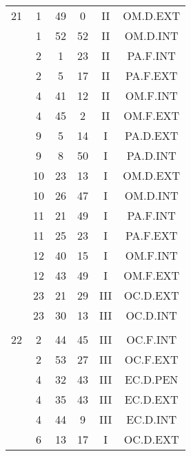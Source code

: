 \documentclass[12pt, a4paper]{article}
\begin{document}
\begin{multicols}{3}
{\begin{tabular}{c c c c c c}
	 	 	 	21 & 1 & 49 & 0 & II & OM.D.EXT\\%
	 	 	 	 & 1 & 52 & 52 & II & OM.D.INT\\%
	 	 	 	 & 2 & 1 & 23 & II & PA.F.INT\\%
	 	 	 	 & 2 & 5 & 17 & II & PA.F.EXT\\%
	 	 	 	 & 4 & 41 & 12 & II & OM.F.INT\\%
	 	 	 	 & 4 & 45 & 2 & II & OM.F.EXT\\%
	 	 	 	 & 9 & 5 & 14 & I & PA.D.EXT\\%
	 	 	 	 & 9 & 8 & 50 & I & PA.D.INT\\%
	 	 	 	 & 10 & 23 & 13 & I & OM.D.EXT\\%
	 	 	 	 & 10 & 26 & 47 & I & OM.D.INT\\%
	 	 	 	 & 11 & 21 & 49 & I & PA.F.INT\\%
	 	 	 	 & 11 & 25 & 23 & I & PA.F.EXT\\%
	 	 	 	 & 12 & 40 & 15 & I & OM.F.INT\\%
	 	 	 	 & 12 & 43 & 49 & I & OM.F.EXT\\%
	 	 	 	 & 23 & 21 & 29 & III & OC.D.EXT\\%
	 	 	 	 & 23 & 30 & 13 & III & OC.D.INT\\%
	 	 	 	 & & & & & \\%
	 	 	 	22 & 2 & 44 & 45 & III & OC.F.INT\\%
	 	 	 	 & 2 & 53 & 27 & III & OC.F.EXT\\%
	 	 	 	 & 4 & 32 & 43 & III & EC.D.PEN\\%
	 	 	 	 & 4 & 35 & 43 & III & EC.D.EXT\\%
	 	 	 	 & 4 & 44 & 9 & III & EC.D.INT\\%
	 	 	 	 & 6 & 13 & 17 & I & OC.D.EXT\\%

\end{tabular}}
\end{multicols}
\end{document}
